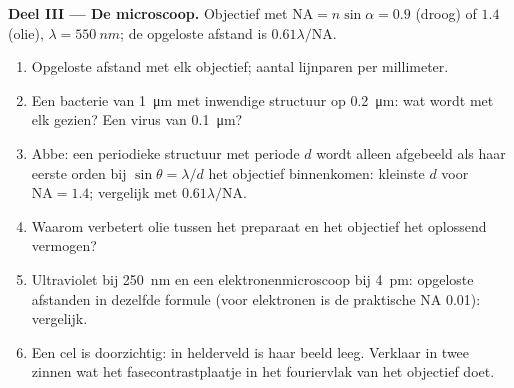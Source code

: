 \begin{problem}
\medskip
\noindent\textbf{Deel III --- De microscoop.}
Objectief met  $\mathrm{NA} = n\sin\alpha = 0.9$ (droog) of $1.4$
(olie), $\lambda = \qty{550}{nm}$; de opgeloste afstand is
$0.61\lambda/\mathrm{NA}$.
\begin{enumerate}[resume]
  \item Opgeloste afstand met elk objectief; aantal lijnparen
        per millimeter.
  \item Een bacterie van \qty{1}{\micro m} met inwendige structuur op
        \qty{0.2}{\micro m}: wat wordt met elk gezien? Een virus van
        \qty{0.1}{\micro m}?
  \item Abbe: een periodieke structuur met periode $d$ wordt alleen
        afgebeeld als haar
        eerste orden bij $\sin\theta = \lambda/d$ het objectief binnenkomen:
        kleinste $d$
        voor $\mathrm{NA} = 1.4$; vergelijk met $0.61\lambda/\mathrm{NA}$.
  \item Waarom verbetert olie tussen het preparaat en het objectief het
        oplossend vermogen?
  \item Ultraviolet bij \qty{250}{nm} en een elektronenmicroscoop bij \qty{4}{pm}:
        opgeloste afstanden in dezelfde formule (voor elektronen is de
        praktische NA \qty{0.01}{}): vergelijk.
  \item Een cel is doorzichtig: in helderveld is haar beeld leeg.
        Verklaar in twee zinnen wat het fasecontrastplaatje in het
        fouriervlak van het objectief doet.
\end{enumerate}


\end{problem}
